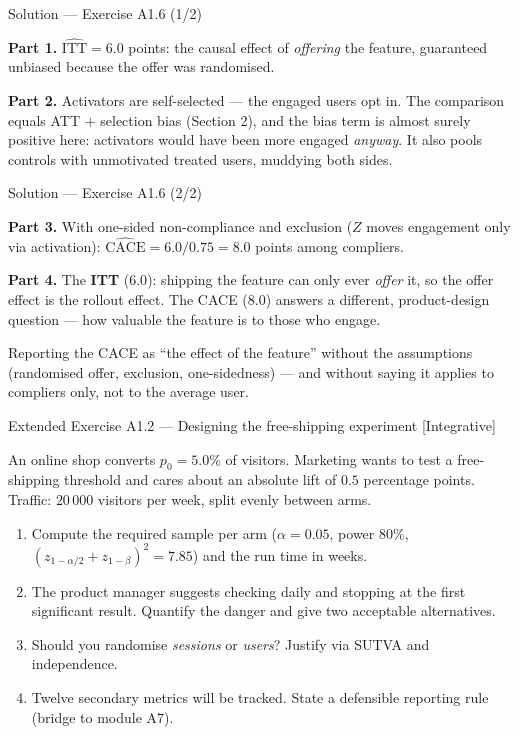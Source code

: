 \documentclass[aspectratio=169,11pt]{beamer}
\begin{document}
\begin{frame}{Solution --- Exercise A1.6 (1/2)}
\begin{solutionbox}
  \textbf{Part 1.} $\widehat{\mathrm{ITT}} = 6.0$ points: the causal effect of
  \emph{offering} the feature, guaranteed unbiased because the offer was randomised.

  \smallskip
  \textbf{Part 2.} Activators are self-selected --- the engaged users opt in. The
  comparison equals ATT $+$ selection bias (Section 2), and the bias term is almost
  surely positive here: activators would have been more engaged \emph{anyway}. It also
  pools controls with unmotivated treated users, muddying both sides.
\end{solutionbox}
\end{frame}

\begin{frame}{Solution --- Exercise A1.6 (2/2)}
\begin{solutionbox}
  \smallskip
  \textbf{Part 3.} With one-sided non-compliance and exclusion ($Z$ moves engagement
  only via activation): $\widehat{\mathrm{CACE}} = 6.0/0.75 = \mathbf{8.0}$ points among
  compliers.

  \smallskip
  \textbf{Part 4.} The \textbf{ITT} ($6.0$): shipping the feature can only ever
  \emph{offer} it, so the offer effect is the rollout effect. The CACE ($8.0$) answers a
  different, product-design question --- how valuable the feature is to those who engage.
\end{solutionbox}
\begin{mistake}
  Reporting the CACE as ``the effect of the feature'' without the assumptions
  (randomised offer, exclusion, one-sidedness) --- and without saying it applies to
  compliers only, not to the average user.
\end{mistake}
\end{frame}

\begin{frame}{Extended Exercise A1.2 --- Designing the free-shipping experiment [Integrative]}
\begin{longexercise}
  An online shop converts $p_0 = 5.0\%$ of visitors. Marketing wants to test a
  free-shipping threshold and cares about an absolute lift of $0.5$ percentage points.
  Traffic: $20\,000$ visitors per week, split evenly between arms.
  \begin{enumerate}
    \item Compute the required sample per arm ($\alpha=0.05$, power $80\%$,
          $(z_{1-\alpha/2}+z_{1-\beta})^2=7.85$) and the run time in weeks.
    \item The product manager suggests checking daily and stopping at the first
          significant result. Quantify the danger and give two acceptable alternatives.
    \item Should you randomise \emph{sessions} or \emph{users}? Justify via SUTVA and
          independence.
    \item Twelve secondary metrics will be tracked. State a defensible reporting rule
          (bridge to module A7).
  \end{enumerate}
\end{longexercise}
\end{frame}
\end{document}
